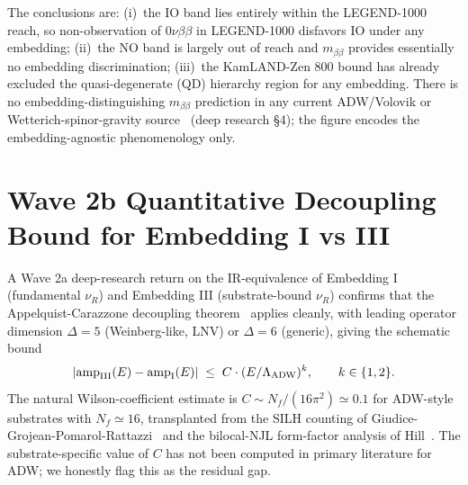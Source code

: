 \documentclass[aps,prd,twocolumn,showpacs,superscriptaddress,nofootinbib]{revtex4-2}
\newcommand{\SterileNu}{\nu_R}
\newcommand{\LambdaADW}{\Lambda_{\rm ADW}}
\newcommand{\mbb}{m_{\beta\beta}}
\begin{document}
The conclusions are: (i)~the IO band lies entirely within the LEGEND-1000
reach, so non-observation of $0\nu\beta\beta$ in LEGEND-1000 disfavors
IO under any embedding; (ii)~the NO band is largely out of reach and
$\mbb$ provides essentially no embedding discrimination; (iii)~the
KamLAND-Zen 800 bound has already excluded the quasi-degenerate (QD)
hierarchy region for any embedding. There is no embedding-distinguishing
$\mbb$ prediction in any current ADW/Volovik or Wetterich-spinor-gravity
source~\cite{ADW,WetterichSpinor2013,Volovik2024Spinor} (deep research
\S 4); the figure encodes the embedding-agnostic phenomenology only.

\section{Wave 2b Quantitative Decoupling Bound for Embedding I vs III}
\label{sec:decoupling}

A Wave 2a deep-research return on the IR-equivalence of Embedding I (fundamental
$\SterileNu$) and Embedding III (substrate-bound $\SterileNu$) confirms that the
Appelquist-Carazzone decoupling theorem~\cite{AppelquistCarazzone1975,BallThorne1994}
applies cleanly, with leading operator dimension $\Delta = 5$ (Weinberg-like,
LNV) or $\Delta = 6$ (generic), giving the schematic bound
\begin{equation}
  |\mathrm{amp}_{\rm III}(E) - \mathrm{amp}_{\rm I}(E)|
    \;\le\; C \cdot (E / \LambdaADW)^k,
  \qquad k \in \{1, 2\}.
\end{equation}
The natural Wilson-coefficient estimate is $C \sim N_f/(16\pi^2) \simeq 0.1$ for
ADW-style substrates with $N_f \simeq 16$, transplanted from the SILH counting
of Giudice-Grojean-Pomarol-Rattazzi~\cite{GiudiceGrojeanPomarolRattazzi2007} and
the bilocal-NJL form-factor analysis of Hill~\cite{Hill2024Bilocal}. The
substrate-specific value of $C$ has not been computed in primary literature for
ADW; we honestly flag this as the residual gap.
\end{document}
